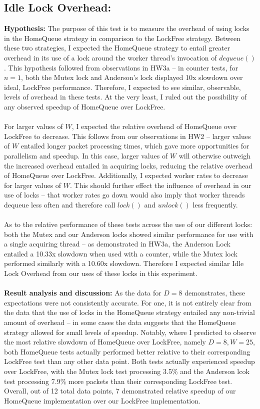\documentclass[]{article}
\begin{document}
\subsection{Idle Lock Overhead:}
\textbf{Hypothesis:}
The purpose of this test is to measure the overhead of using locks in the HomeQueue strategy in comparison to the LockFree strategy. Between these two strategies, I expected the HomeQueue strategy to entail greater overhead in its use of a lock around the worker thread's invocation of $dequeue()$. This hypothesis followed from  observations in HW3a -- in counter tests, for $n = 1$, both the Mutex lock and Anderson's lock displayed 10x slowdown over ideal, LockFree performance. Therefore, I expected to see similar, observable, levels of overhead in these tests. At the very least, I ruled out the possibility of any observed speedup of HomeQueue over LockFree. 
\\\\
For larger values of $W$, I expected the relative overhead of HomeQueue over LockFree to decrease. This follows from our observations in HW2 -- larger values of $W$ entailed longer packet processing times, which gave more opportunities for parallelism and speedup. In this case, larger values of $W$ will otherwise outweigh the increased overhead entailed in acquiring locks, reducing the relative overhead of HomeQueue over LockFree. Additionally, I expected worker rates to decrease for larger values of $W$. This should further effect the influence of overhead in our use of locks -- that worker rates go down would also imply that worker threads dequeue less often and therefore call $lock()$ and $unlock()$ less frequently.
\\\\
As to the relative performance of these tests across the use of our different locks: both the Mutex and our Anderson locks showed similar performance for use with a single acquiring thread -- as demonstrated in HW3a, the Anderson Lock entailed a 10.33x slowdown when used with a counter, while the Mutex lock performed similarly with a 10.60x slowdown. Therefore I expected similar Idle Lock Overhead from our uses of these locks in this experiment.
\\\\
\textbf{Result analysis and discussion:}
As the data for $D = 8$ demonstrates, these expectations were not consistently accurate. For one, it is not entirely clear from the data that the use of locks in the HomeQueue strategy entailed any non-trivial amount of overhead -- in some cases the data suggests that the HomeQueue strategy allowed for small levels of speedup. Notably, where I predicted to observe the most relative slowdown of HomeQueue over LockFree, namely $D = 8, W = 25$,  both HomeQueue tests actually performed better relative to their corresponding LockFree test than any other data point. Both tests actually experienced speedup over LockFree, with the Mutex lock test processing 3.5\% and the Anderson lcok test processing 7.9\% more packets than their corresponding LockFree test. Overall, out of 12 total data points, 7 demonstrated relative speedup of our HomeQueue implementation over our LockFree implementation.
\end{document}
